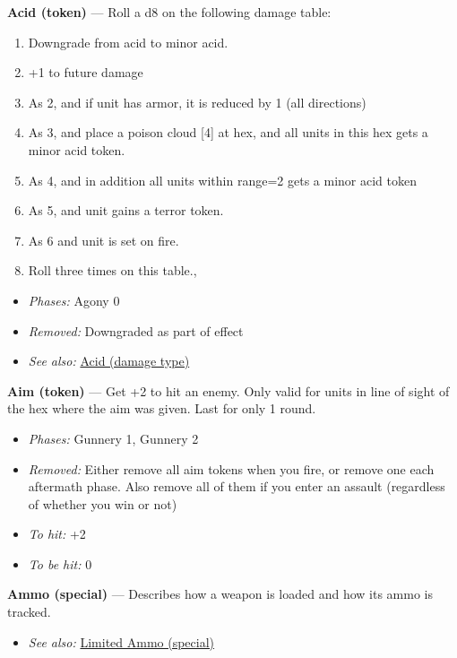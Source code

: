 \documentclass[a4paper,12pt]{article}
\begin{document}
\label{rule-token-acid}%
\noindent\textbf{Acid (token)} --- Roll a d8 on the following damage table:
\begin{enumerate}
\item Downgrade from acid to minor acid.
\item +1 to future damage
\item As 2, and if unit has armor, it is reduced by 1 (all directions)
\item As 3, and place a poison cloud [4] at hex, and all units in this hex gets a minor acid token.
\item As 4, and in addition all units within range=2 gets a minor acid token
\item As 5, and unit gains a terror token.
\item As 6 and unit is set on fire.
\item Roll three times on this table.,
\end{enumerate}
\begin{itemize}
\item \textit{Phases:} Agony 0
\item \textit{Removed:} Downgraded as part of effect
\item \textit{See also:} \hyperref[rule-damage-type-acid]{Acid (damage type)}
\end{itemize}


\label{rule-token-aim}%
\noindent\textbf{Aim (token)} --- Get +2 to hit an enemy. Only valid for units in line of sight of the hex where the aim was given. Last for only 1 round.
\begin{itemize}
\item \textit{Phases:} Gunnery 1, Gunnery 2
\item \textit{Removed:} Either remove all aim tokens when you fire, or remove one each aftermath phase. Also remove all of them if you enter an assault (regardless of whether you win or not)
\item \textit{To hit:} +2
\item \textit{To be hit:} 0
\end{itemize}


\label{rule-special-ammo}%
\noindent\textbf{Ammo (special)} --- Describes how a weapon is loaded and how its ammo is tracked.
\begin{itemize}
\item \textit{See also:} \hyperref[rule-special-limited-ammo]{Limited Ammo (special)}
\end{itemize}
\end{document}
